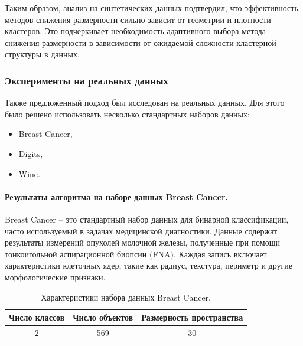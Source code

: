                Таким образом, анализ на синтетических данных подтвердил, что эффективность методов снижения размерности сильно зависит от геометрии и плотности кластеров. Это подчеркивает необходимость адаптивного выбора метода снижения размерности в зависимости от ожидаемой сложности кластерной структуры в данных.

        \subsubsection{Эксперименты на реальных данных}

            Также предложенный подход был исследован на реальных данных. Для этого было решено использовать несколько стандартных наборов данных:

            \begin{itemize}
                \item Breast Cancer,
                \item Digits,
                \item Wine.
            \end{itemize}

            \paragraph{Результаты алгоритма на наборе данных Breast Cancer.}
                Breast Cancer -- это стандартный набор данных для бинарной классификации, часто используемый в задачах медицинской диагностики. Данные содержат результаты измерений опухолей молочной железы, полученные при помощи тонкоигольной аспирационной биопсии (FNA). Каждая запись включает характеристики клеточных ядер, такие как радиус, текстура, периметр и другие морфологические признаки.

                \begin{table}[H]
                    \centering
                    \caption{Характеристики набора данных Breast Cancer.}
                    \begin{tabular}{ccc}
                        \toprule
                        Число классов & Число объектов & Размерность пространства \\
                        \midrule
                        2 & 569 & 30 \\
                        \bottomrule
                    \end{tabular}
                \end{table}


